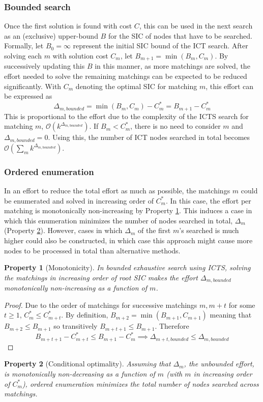 \documentclass[english,10pt]{article}
\newtheorem{property}{Property}
\begin{document}
	\subsubsection{Bounded search}
	Once the first solution is found with cost $C$, this can be used in the next search as an (exclusive) upper-bound $B$ for the SIC of nodes that have to be searched. Formally, let $B_0 = \infty$ represent the initial SIC bound of the ICT search. After solving each $m$ with solution cost $C_m$, let $B_{m+1} = \min(B_m,C_m)$. By successively updating this $B$ in this manner, as more matchings are solved, the effort needed to solve the remaining matchings can be expected to be reduced significantly. With $C_m$ denoting the optimal SIC for matching $m$, this effort can be expressed as	
	\[\Delta_{m,bounded} = \min(B_m,C_m) - C^*_m = B_{m+1} - C^*_m\]
	This is proportional to the effort due to the complexity of the ICTS search for matching $m$, $\mathcal{O}(k^{\Delta_{m,bounded}})$.
	If $B_m < C^*_m$, there is no need to consider $m$ and $\Delta_{m,bounded} = 0$.
	Using this, the number of ICT nodes searched in total becomes $\mathcal{O}(\sum_m k^{\Delta_{m,bounded}})$.
	\subsubsection{Ordered enumeration}
	\label{ordered-enum}
	In an effort to reduce the total effort as much as possible, the matchings $m$ could be enumerated and solved in increasing order of $C^*_m$. In this case, the effort per matching is monotonically non-increasing by Property \ref{monotonicity}. This induces a case in which this enumeration minimizes the number of nodes searched in total, $\Delta_m$ (Property \ref{cond-monoton-optim}). However, cases in which $\Delta_m$ of the first $m$'s searched is much higher could also be constructed, in which case this approach might cause more nodes to be processed in total than alternative methods.
	
	\begin{property}[Monotonicity]
		\label{monotonicity}
		In bounded exhaustive search using ICTS, solving the matchings in increasing order of root SIC makes the effort $\Delta_{m,bounded}$ monotonically non-increasing as a function of $m$.
	\end{property}
	\begin{proof}
		Due to the order of matchings for successive matchings $m,m+t$ for some $t\geq 1$, $C^*_{m} \leq C^*_{m+t}$. By definition, $B_{m+2} = \min(B_{m+1},C_{m+1})$ meaning that $B_{m+2} \leq B_{m + 1}$ so transitively $B_{m+t+1} \leq B_{m+1}$. Therefore
		\[B_{m+t+1} - C^*_{m+t}\leq B_{m+1} - C^*_m\implies \Delta_{m+t,bounded} \leq \Delta_{m,bounded}\]
	\end{proof}
	\begin{property}[Conditional optimality]
	\label{cond-monoton-optim}
	Assuming that $\Delta_m$, the unbounded effort, is monotonically non-decreasing as a function of $m$ (with $m$ in increasing order of $C^*_m$), ordered enumeration minimizes the total number of nodes searched across matchings.
	\end{property}
\end{document}
